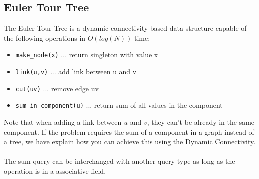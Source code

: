 \subsection{Euler Tour Tree}
The Euler Tour Tree is a dynamic connectivity based data structure \cite{Henzinger1998Nov} \cite{Miltersen1994Aug} capable of the following operations in $O(log(N))$ time:

{
\begin{itemize}
  \item{\lstinline{make_node(x)} ... return singleton with value x}
  \item{\lstinline{link(u,v)} ... add link between u and v}
  \item{\lstinline{cut(uv)} ... remove edge uv}
  \item{\lstinline{sum_in_component(u)} ... return sum of all values in the component}
\end{itemize}
}

Note that when adding a link between $u$ and $v$, they can't be already in the same component.
If the problem requires the sum of a component in a graph instead of a tree, we have explain
how you can achieve this using the Dynamic Connectivity.
\\
\\
The sum query can be interchanged with another query type
as long as the operation is in a associative field.



